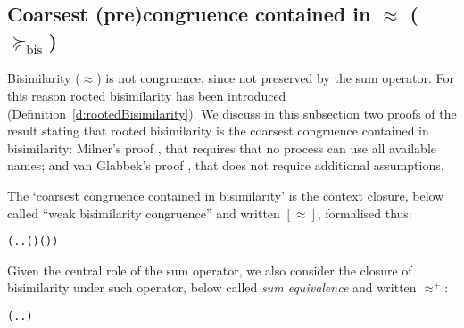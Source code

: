 
\subsection{Coarsest (pre)congruence contained in $\approx$ ($\succeq_{\mathrm{bis}}$)}
\label{s:coarsest}


Bisimilarity ($\approx$) is not  congruence, since not preserved by 
the sum operator. For this reason rooted bisimilarity has been
introduced (Definition~\ref{d:rootedBisimilarity}). 
We discuss in this subsection two proofs of the result stating that
rooted bisimilarity is the coarsest congruence contained in
bisimilarity: Milner's proof \cite{Mil89}, that requires
that no process can use all available names; and van Glabbek's proof
\cite{vanGlabbeek:2005ur}, that does not require additional assumptions. 

The `coarsest congruence contained in bisimilarity' is 
the context closure, below called 
``weak bisimilarity congruence'' and written $[\approx]$, formalised thus:
\begin{alltt}
 \HOLSymConst{=}  
  \HOLSymConst{=} (\HOLTokenLambda{} . \HOLSymConst{\HOLTokenForall{}}.   \HOLSymConst{\HOLTokenImp{}}  ( ) ( ))
\end{alltt}

Given the central role of the  
 sum operator, we also consider the closure of bisimilarity under such
 operator, 
below called \emph{sum equivalence} and written $\approx^+$:
\begin{alltt}
 \HOLSymConst{=} (\HOLTokenLambda{} . \HOLSymConst{\HOLTokenForall{}}.  \HOLSymConst{+}  \HOLSymConst{\HOLTokenWeakEQ}  \HOLSymConst{+} )
\end{alltt}


